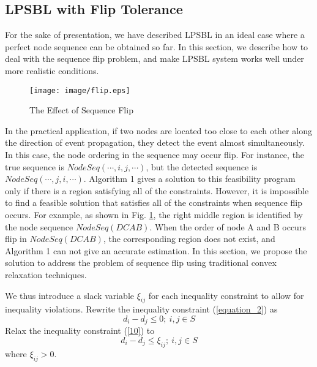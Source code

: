 \subsection{LPSBL with Flip Tolerance }

For the sake of presentation, we have described LPSBL in an ideal case where a perfect node sequence can be obtained so far. 
In this section, we describe how to deal with the sequence flip problem, and make LPSBL system works well under more realistic conditions. 
    \begin{figure}[H]
    \centering
 \setlength{\abovecaptionskip}{-15pt}
    \texttt{[image: image/flip.eps]} 
	\vspace{10mm}
    \caption{The Effect of Sequence Flip}
	\label{flip}
    \vspace{-5mm}
    \end{figure}
In the practical application, if two nodes are located too close to each other along the direction of event propagation, they detect the event almost simultaneously. 
In this case, the node ordering in the sequence may occur flip. 
For instance, the true sequence is $NodeSeq ( \cdots ,i,j, \cdots )$, but the detected sequence is $NodeSeq ( \cdots ,j,i, \cdots )$.
Algorithm 1 gives a solution to this feasibility program only if there is a region satisfying all of the constraints. 
However, it is impossible to find a feasible solution that satisfies all of the constraints when sequence flip occurs. 
For example, as shown in Fig. \ref{flip}, the right middle region is identified by the node sequence $NodeSeq (D C A B)$. 
When the order of node A and B occurs flip in $NodeSeq (D C A B)$, the corresponding region does not exist, and Algorithm 1 can not give an accurate estimation.
In this section, we propose the solution to address the problem of sequence flip using traditional convex relaxation techniques.


We thus introduce a slack variable ${\xi _{ij}}$ for each inequality constraint to allow for inequality violations.
Rewrite the inequality constraint (\ref{equation_2}) as
 \begin{equation} \label{10}
 d_i - d_j  \le  0 ; \  i,j \in S
 \end{equation}
 Relax the inequality constraint (\ref{10}) to
 \begin{equation} \label{11}
 d_i - d_j  \le  \xi _{ij} ; \  i,j \in S
 \end{equation}
 where
 \begin{math}
 \xi _{ij}  > 0
 \end{math}.
 
